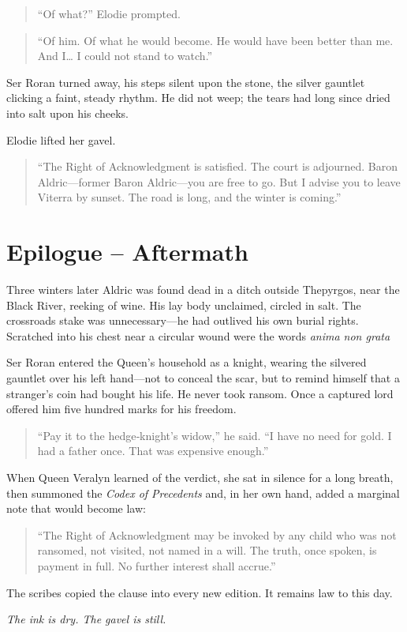 \documentclass[11pt]{book}
\begin{document}
\begin{quote}
``Of what?'' Elodie prompted.
\end{quote}

\begin{quote}
``Of him. Of what he would become. He would have been better than me. And I… I could not stand to watch.''
\end{quote}

Ser Roran turned away, his steps silent upon the stone, the silver gauntlet clicking a faint, steady rhythm. He did not weep; the tears had long since dried into salt upon his cheeks.

Elodie lifted her gavel.

\begin{quote}
``The Right of Acknowledgment is satisfied. The court is adjourned. Baron Aldric—former Baron Aldric—you are free to go. But I advise you to leave Viterra by sunset. The road is long, and the winter is coming.''
\end{quote}

\section*{Epilogue – Aftermath}
Three winters later Aldric was found dead in a ditch outside Thepyrgos, near the Black River, reeking of wine. His lay body unclaimed, circled in salt. The crossroads stake was unnecessary—he had outlived his own burial rights. Scratched into his chest near a circular wound were the words \textit{anima non grata}

Ser Roran entered the Queen’s household as a knight, wearing the silvered gauntlet over his left hand—not to conceal the scar, but to remind himself that a stranger’s coin had bought his life. He never took ransom. Once a captured lord offered him five hundred marks for his freedom.

\begin{quote}
``Pay it to the hedge‑knight’s widow,'' he said. ``I have no need for gold. I had a father once. That was expensive enough.''
\end{quote}

When Queen Veralyn learned of the verdict, she sat in silence for a long breath, then summoned the \textit{Codex of Precedents} and, in her own hand, added a marginal note that would become law:

\begin{quote}
``The Right of Acknowledgment may be invoked by any child who was not ransomed, not visited, not named in a will. The truth, once spoken, is payment in full. No further interest shall accrue.''
\end{quote}

The scribes copied the clause into every new edition. It remains law to this day.

\bigskip
\noindent\textit{The ink is dry. The gavel is still.}
\end{document}
